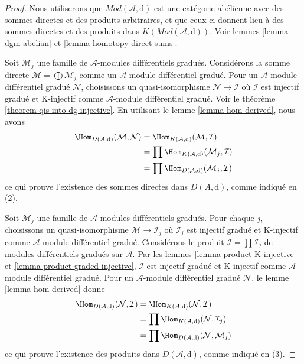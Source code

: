\begin{proof}
Nous utiliserons que $\textit{Mod}(\mathcal{A}, \text{d})$ est une catégorie abélienne
avec des sommes directes et des produits arbitraires, et que ceux-ci donnent
lieu à des sommes directes et des produits dans $K(\textit{Mod}(\mathcal{A}, \text{d}))$.
Voir lemmes \ref{lemma-dgm-abelian} et \ref{lemma-homotopy-direct-sums}.

\medskip\noindent
Soit $\mathcal{M}_j$ une famille de $\mathcal{A}$-modules différentiels gradués.
Considérons la somme directe $\mathcal{M} = \bigoplus \mathcal{M}_j$
comme un $\mathcal{A}$-module différentiel gradué.
Pour un $\mathcal{A}$-module différentiel gradué
$\mathcal{N}$, choisissons un quasi-isomorphisme
$\mathcal{N} \to \mathcal{I}$
où $\mathcal{I}$ est injectif gradué et K-injectif comme
$\mathcal{A}$-module différentiel gradué. Voir le
théorème \ref{theorem-qis-into-dg-injective}.
En utilisant le lemme \ref{lemma-hom-derived},
nous avons \begin{align*}
\Hom_{D(\mathcal{A}, \text{d})}(\mathcal{M}, \mathcal{N})
&
= \Hom_{K(\mathcal{A}, \text{d})}(\mathcal{M}, \mathcal{I}) \\
&
= \prod \Hom_{K(\mathcal{A}, \text{d})}(\mathcal{M}_j, \mathcal{I}) \\
&
= \prod \Hom_{D(\mathcal{A}, \text{d})}(\mathcal{M}_j, \mathcal{I})
\end{align*}
ce qui prouve l'existence des sommes directes dans $D(A, \text{d})$,
comme indiqué en (2).

\medskip\noindent
Soit $\mathcal{M}_j$ une famille de $\mathcal{A}$-modules différentiels gradués.
Pour chaque $j$, choisissons un
quasi-isomorphisme $\mathcal{M} \to \mathcal{I}_j$
où $\mathcal{I}_j$ est injectif gradué et K-injectif
comme $\mathcal{A}$-module différentiel
gradué. Considérons le produit $\mathcal{I} = \prod \mathcal{I}_j$
de modules différentiels gradués sur $\mathcal{A}$.
Par les lemmes \ref{lemma-product-K-injective}
et \ref{lemma-product-graded-injective},
$\mathcal{I}$ est injectif gradué et K-injectif
comme $\mathcal{A}$-module différentiel
gradué. Pour un $\mathcal{A}$-module différentiel
gradué $\mathcal{N}$, le lemme \ref{lemma-hom-derived} donne
\begin{align*}
\Hom_{D(\mathcal{A}, \text{d})}(\mathcal{N}, \mathcal{I})
&
= \Hom_{K(\mathcal{A}, \text{d})}(\mathcal{N}, \mathcal{I}) \\
&
= \prod \Hom_{K(\mathcal{A}, \text{d})}(\mathcal{N}, \mathcal{I}_j) \\
&
= \prod \Hom_{D(\mathcal{A}, \text{d})}(\mathcal{N}, \mathcal{M}_j)
\end{align*}
ce qui prouve l'existence des produits dans $D(\mathcal{A}, \text{d})$,
comme indiqué en (3).
\end{proof}







